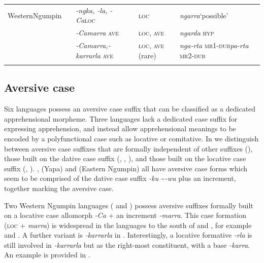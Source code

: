 \documentclass[output=paper,colorlinks,citecolor=brown]{langscibook}
\begin{document}
\begin{table}
\begin{tabularx}{\textwidth}{p{1.5cm}lQQQ}
 \midrule
Western\newline Ngumpin &  & \textit{-ngka, -la, -Ca}\newline \textsc{loc}   & \textsc{loc} & \textit{ngarra}\newline `possible'   \\
\tablevspace
 &  & \textit{-Camarra} \textsc{ave} & \textsc{loc}, \textsc{ave} & \textit{ngarda} \textsc{hyp} \\
\tablevspace
 &  & \textit{-Camarra,}\newline \textit{-karrarla} \textsc{ave}   & \textsc{loc}, \textsc{ave} (rare) & \textit{nga-rta} \textsc{mr1-dub}\newline  \textit{pa-rta} \textsc{mr2-dub}   \\
\lspbottomrule
\end{tabularx}
\end{table}



\subsection{Aversive case}
\label{subsec:aversivecase}

Six  languages possess an aversive case suffix that can be classified as a dedicated apprehensional morpheme. Three languages lack a dedicated case suffix for expressing apprehension, and instead allow apprehensional meanings to be encoded by a polyfunctional case such as locative or comitative. In  we distinguish between aversive case suffixes that are formally independent of other suffixes (), those built on the dative case suffix (, , ), and those built on the locative case suffix (, ). ,  (Yapa) and  (Eastern Ngumpin) all have aversive case forms which seem to be comprised of the dative case suffix \textit{-ku} \textasciitilde \textit{-wu} plus an increment, together marking the aversive case. 

\largerpage
Two Western Ngumpin languages ( and ) possess aversive suffixes formally built on a locative case allomorph \textit{-Ca} + an increment \textit{-marra}. This case formation (\textsc{loc} + \textit{marra}) is widespread in the  languages to the south of  and , for example  and . A further variant is \textit{-karrarla} in . Interestingly, a locative formative \textit{-rla} is still involved in \textit{-karrarla} but as the right-most constituent, with a base \textit{-karra}. An example is provided in .
\end{document}
